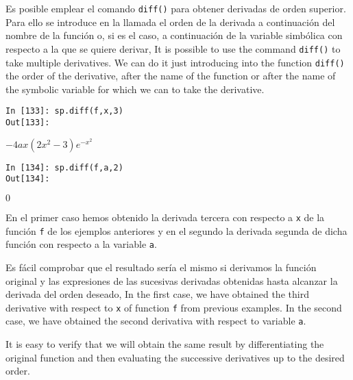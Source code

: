 \begin{paracol}{2}
Es posible emplear el comando \texttt{diff()} para obtener derivadas de orden superior. Para ello se introduce en la llamada el orden de la derivada a continuación del nombre de la función o, si es el caso, a continuación de la variable simbólica con respecto a la que se quiere derivar,
\switchcolumn
It is possible to use the command \texttt{diff()} to take multiple derivatives. We can do it just introducing into the function \texttt{diff()} the order of the derivative, after the name of the function or after the name of the symbolic variable for which we can to take the derivative. 
\end{paracol}
\begin{center}
	\begin{minipage}{.5\textwidth}
		\begin{verbatim}
In [133]: sp.diff(f,x,3)
Out[133]: 

		\end{verbatim}
		$-4ax(2x^2-3)e^{-x^2}$
		\begin{verbatim}
In [134]: sp.diff(f,a,2)
Out[134]: 
		\end{verbatim}
		$0$
	\end{minipage}
\end{center}
\begin{paracol}{2}
En el primer caso hemos obtenido la derivada tercera con respecto a \texttt{x} de la función \texttt{f} de los ejemplos anteriores y en el segundo la derivada segunda de dicha función con respecto a la variable \texttt{a}. 

Es fácil comprobar que el resultado sería el mismo si derivamos la función original y las expresiones de las sucesivas derivadas obtenidas hasta alcanzar la derivada del orden deseado,
\switchcolumn
In the first case, we have obtained the third derivative with respect to \texttt{x} of function \texttt{f} from previous examples. In the second case, we have obtained the second derivativa with respect to variable \texttt{a}.

It is easy to verify that we will obtain the same result by differentiating the original function and then evaluating the successive derivatives up to the desired order.   

\end{paracol}

